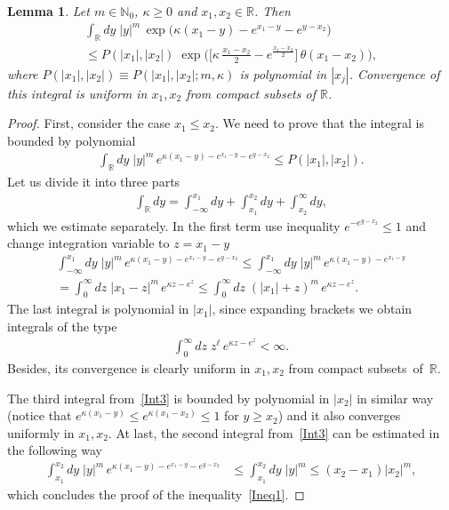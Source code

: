 \documentclass[11pt]{article}
\numberwithin{equation}{section}
\theoremstyle{plain}
\newtheorem{lemma}{Lemma}
\theoremstyle{definition}
\begin{document}
\begin{lemma} \label{lemma2}
	Let $m \in \mathbb{N}_0$, $\kappa \geq 0$ and $x_1, x_2 \in \mathbb{R}$. Then
	\begin{multline}
		\int_{\mathbb{R}} dy\; |y|^m \, \exp\bigl(\kappa (x_1 - y) - e^{x_1 - y} - e^{y - x_2} \bigr) \\
		\leq P(|x_1|, |x_2|) \; \exp \biggl( \biggl[ \kappa \, \frac{x_1 - x_2}{2} -e^{ \frac{x_1 - x_2}{2} } \biggr] \, \theta(x_1 - x_2) \biggr),
	\end{multline}
	where $P(|x_1|, |x_2|) \equiv P(|x_1|, |x_2|; m, \kappa)$ is polynomial in $|x_j|$. Convergence of this integral is uniform in $x_1, x_2$ from compact subsets of $\mathbb{R}$.
\end{lemma}

\begin{proof}
	First, consider the case $x_1 \leq x_2$. We need to prove that the integral is bounded by polynomial
	\begin{align}\label{Ineq1}
		\int_{\mathbb{R}} dy\;  |y|^m \, e^{\kappa (x_1 - y) - e^{x_1 - y} - e^{y - x_2}} \leq P(|x_1|, |x_2|).
	\end{align}
	Let us divide it into three parts 
	\begin{align}\label{Int3}
		\int_{\mathbb{R}} dy = \int_{-\infty}^{x_1} dy + \int_{x_1}^{x_2} dy + \int_{x_2}^{\infty} dy,
	\end{align}
	which we estimate separately. In the first term use inequality $e^{-e^{y - x_2}} \leq 1$ and change integration variable to $z = x_1 - y$
	\begin{multline}
		\int_{-\infty}^{x_1} dy \; |y|^m \, e^{\kappa (x_1 - y) - e^{x_1 - y} - e^{y - x_2}} \leq \int_{-\infty}^{x_1} dy \; |y|^m \, e^{\kappa (x_1 - y) - e^{x_1 - y}} \\[6pt]
		= \int_{0}^{\infty} dz \; |x_1 - z|^m \, e^{\kappa z- e^{z}} \leq \int_{0}^{\infty} dz \; (|x_1| + z)^m \, e^{\kappa z - e^{z}}.
	\end{multline}
	The last integral is polynomial in $|x_1|$, since expanding brackets we obtain integrals of the type
	\begin{align}
		\int_0^\infty dz \; z^\ell \, e^{ \kappa z - e^{z}} < \infty.
	\end{align}
	Besides, its convergence is clearly uniform in $x_1, x_2$ from compact subsets~of~$\mathbb{R}$.
	
	The third integral from~\eqref{Int3} is bounded by polynomial in $|x_2|$ in similar way (notice that $e^{\kappa (x_1 - y)} \leq e^{\kappa(x_1 - x_2)} \leq 1$ for $y \geq x_2$) and it also converges uniformly in $x_1, x_2$.
	At last, the second integral from~\eqref{Int3} can be estimated in the following way
	\begin{align}
		\int_{x_1}^{x_2} dy \; |y|^m \, e^{\kappa (x_1 - y) - e^{x_1 - y} - e^{y - x_2}} & \leq \int_{x_1}^{x_2} dy \; |y|^m \leq (x_2 - x_1) |x_2|^{m},
	\end{align} 
	which concludes the proof of the inequality~\eqref{Ineq1}. 
	

\end{proof}
\end{document}
